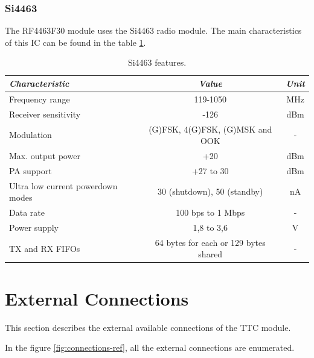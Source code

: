 \documentclass[12pt]{book}
\begin{document}
\subsubsection{Si4463}

The RF4463F30 module uses the Si4463 radio module. The main characteristics of this IC can be found in the table \ref{tab:si4463-info}.

\begin{table}[!h]
	\begin{center}
		\begin{tabular}{lcc}
			\toprule[1.5pt]
			\textit{Characteristic} & \textit{Value} & \textit{Unit} \\
			\midrule
			Frequency range & 119-1050 & MHz \\
			Receiver sensitivity & -126 & dBm \\
			Modulation & (G)FSK, 4(G)FSK, (G)MSK and OOK & - \\
			Max. output power & +20 & dBm \\
			PA support & +27 to 30 & dBm \\
			Ultra low current powerdown modes & 30 (shutdown), 50 (standby) & nA \\
			Data rate & 100 bps to 1 Mbps & - \\
			Power supply & 1,8 to 3,6 & V \\
			TX and RX FIFOs & 64 bytes for each or 129 bytes shared & - \\
			\bottomrule[1.5pt]
		\end{tabular}
		\caption{Si4463 features.}
		\label{tab:si4463-info}
	\end{center}
\end{table}

\section{External Connections}

This section describes the external available connections of the TTC module.

In the figure \ref{fig:connections-ref}, all the external connections are enumerated.
\end{document}
